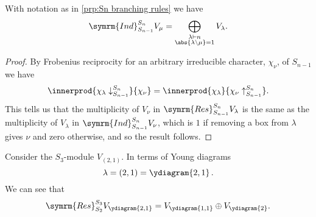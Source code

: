 \documentclass[fleqn]{NotesClass}
\newcommand{\partition}{\vdash}
\newcommand{\Res}{\symrm{Res}}
\newcommand{\Ind}{\symrm{Ind}}
\begin{document}
    
    \begin{crl}{}{}
        With notation as in \cref{prp:Sn branching rules} we have
        \begin{equation}
            \Ind^{S_n}_{S_{n-1}} V_\mu = \bigoplus_{\substack{\lambda \partition n\\ \abs{\lambda\setminus \mu} = 1}} V_\lambda.
        \end{equation}
        \begin{proof}
            By Frobenius reciprocity for an arbitrary irreducible character, \(\chi_\nu\), of \(S_{n-1}\) we have
            \begin{equation}
                \innerprod{\chi_\lambda\downarrow^{S_n}_{S_{n-1}}}{\chi_\nu} = \innerprod{\chi_\lambda}{\chi_\nu\uparrow^{S_n}_{S_{n-1}}}.
            \end{equation}
            This tells us that the multiplicity of \(V_\nu\) in \(\Res^{S_n}_{S_{n-1}}V_\lambda\) is the same as the multiplicity of \(V_\lambda\) in \(\Ind^{S_n}_{S_{n-1}}V_\nu\), which is \(1\) if removing a box from \(\lambda\) gives \(\nu\) and zero otherwise, and so the result follows.
        \end{proof}
    \end{crl}
    
    \begin{exm}{}{}
        Consider the \(S_3\)-module \(V_{(2,1)}\).
        In terms of Young diagrams
        \begin{equation}
            \lambda = (2,1) = \ydiagram{2,1}\,.
        \end{equation}
        We can see that
        \begin{equation}
            \Res^{S_3}_{S_2} V_{\ydiagram{2,1}} = V_{\ydiagram{1,1}} \oplus V_{\ydiagram{2}}.
        \end{equation}
    \end{exm}
    
    
    
    
    
    
	\appendixpage
	\begin{appendices}
	    
	\end{appendices}

    \backmatter
    \renewcommand{\glossaryname}{Acronyms}
    \printglossary[acronym]
    \printindex
\end{document}
